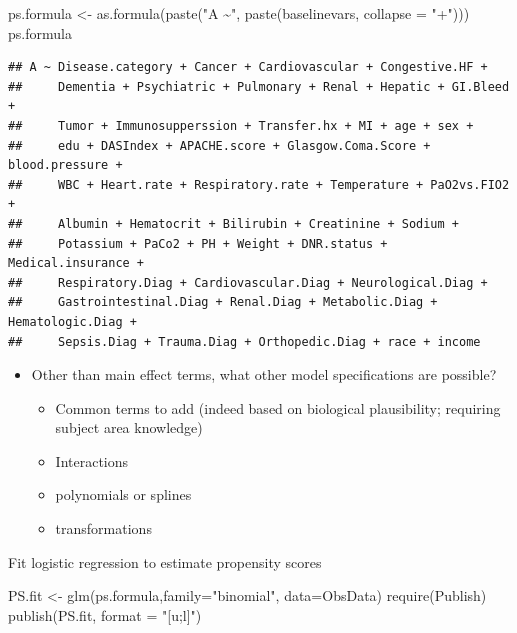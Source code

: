 \documentclass[
]{book}
\newenvironment{Shaded}{\begin{snugshade}}{\end{snugshade}}
\newcommand{\AttributeTok}[1]{\textcolor[rgb]{0.77,0.63,0.00}{#1}}
\newcommand{\FunctionTok}[1]{\textcolor[rgb]{0.00,0.00,0.00}{#1}}
\newcommand{\NormalTok}[1]{#1}
\newcommand{\OtherTok}[1]{\textcolor[rgb]{0.56,0.35,0.01}{#1}}
\newcommand{\StringTok}[1]{\textcolor[rgb]{0.31,0.60,0.02}{#1}}
\providecommand{\tightlist}{%
  \setlength{\itemsep}{0pt}\setlength{\parskip}{0pt}}
\begin{document}
\begin{Shaded}
\begin{Highlighting}[]
\NormalTok{ps.formula }\OtherTok{\textless{}{-}} \FunctionTok{as.formula}\NormalTok{(}\FunctionTok{paste}\NormalTok{(}\StringTok{"A \textasciitilde{}"}\NormalTok{,}
                               \FunctionTok{paste}\NormalTok{(baselinevars,}
                                     \AttributeTok{collapse =} \StringTok{"+"}\NormalTok{)))}
\NormalTok{ps.formula}
\end{Highlighting}
\end{Shaded}

\begin{verbatim}
## A ~ Disease.category + Cancer + Cardiovascular + Congestive.HF + 
##     Dementia + Psychiatric + Pulmonary + Renal + Hepatic + GI.Bleed + 
##     Tumor + Immunosupperssion + Transfer.hx + MI + age + sex + 
##     edu + DASIndex + APACHE.score + Glasgow.Coma.Score + blood.pressure + 
##     WBC + Heart.rate + Respiratory.rate + Temperature + PaO2vs.FIO2 + 
##     Albumin + Hematocrit + Bilirubin + Creatinine + Sodium + 
##     Potassium + PaCo2 + PH + Weight + DNR.status + Medical.insurance + 
##     Respiratory.Diag + Cardiovascular.Diag + Neurological.Diag + 
##     Gastrointestinal.Diag + Renal.Diag + Metabolic.Diag + Hematologic.Diag + 
##     Sepsis.Diag + Trauma.Diag + Orthopedic.Diag + race + income
\end{verbatim}

\begin{itemize}
\tightlist
\item
  Other than main effect terms, what other model specifications are possible?

  \begin{itemize}
  \tightlist
  \item
    Common terms to add (indeed based on biological plausibility; requiring subject area knowledge)
  \item
    Interactions
  \item
    polynomials or splines
  \item
    transformations
  \end{itemize}
\end{itemize}

Fit logistic regression to estimate propensity scores

\begin{Shaded}
\begin{Highlighting}[]
\NormalTok{PS.fit }\OtherTok{\textless{}{-}} \FunctionTok{glm}\NormalTok{(ps.formula,}\AttributeTok{family=}\StringTok{"binomial"}\NormalTok{, }\AttributeTok{data=}\NormalTok{ObsData)}
\FunctionTok{require}\NormalTok{(Publish)}
\FunctionTok{publish}\NormalTok{(PS.fit,  }\AttributeTok{format =} \StringTok{"[u;l]"}\NormalTok{)}
\end{Highlighting}
\end{Shaded}
\end{document}
